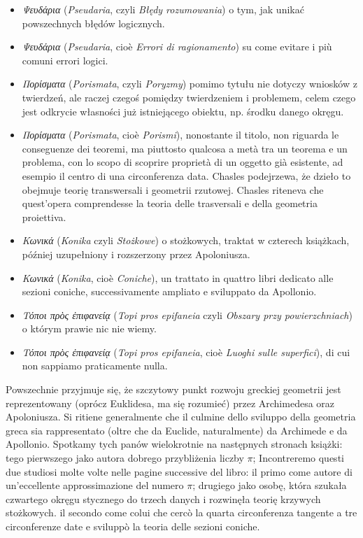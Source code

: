 \begin{itemize}
\item \emph{Ψευδάρια} (\emph{Pseudaria}, czyli \emph{Błędy rozumowania}) o tym, jak unikać powszechnych błędów logicznych. %
\item \emph{Ψευδάρια} (\emph{Pseudaria}, cioè \emph{Errori di ragionamento}) su come evitare i più comuni errori logici. %

\item \emph{Πορίσματα} (\emph{Porismata}, czyli \emph{Poryzmy}) pomimo tytułu nie dotyczy wniosków z twierdzeń, ale raczej czegoś pomiędzy twierdzeniem i problemem, celem czego jest odkrycie własności już istniejącego obiektu, np. środku danego okręgu. %
\item \emph{Πορίσματα} (\emph{Porismata}, cioè \emph{Porismi}), nonostante il titolo, non riguarda le conseguenze dei teoremi, ma piuttosto qualcosa a metà tra un teorema e un problema, con lo scopo di scoprire proprietà di un oggetto già esistente, ad esempio il centro di una circonferenza data. %
Chasles podejrzewa, że dzieło to obejmuje teorię transwersali i geometrii rzutowej. %
Chasles riteneva che quest'opera comprendesse la teoria delle trasversali e della geometria proiettiva. %
%

\item \emph{Κωνικά} (\emph{Konika} czyli \emph{Stożkowe}) o stożkowych, traktat w czterech książkach, później uzupełniony i rozszerzony przez Apoloniusza. %
\item \emph{Κωνικά} (\emph{Konika}, cioè \emph{Coniche}), un trattato in quattro libri dedicato alle sezioni coniche, successivamente ampliato e sviluppato da Apollonio. %

\item \emph{Τόποι πρὸς ἐπιφανείᾳ} (\emph{Topi pros epifaneia} czyli \emph{Obszary przy powierzchniach}) o którym prawie nic nie wiemy. %
\item \emph{Τόποι πρὸς ἐπιφανείᾳ} (\emph{Topi pros epifaneia}, cioè \emph{Luoghi sulle superfici}), di cui non sappiamo praticamente nulla. %
\end{itemize}

Powszechnie przyjmuje się, że szczytowy punkt rozwoju greckiej geometrii jest reprezentowany (oprócz Euklidesa, ma się rozumieć) przez Archimedesa oraz Apoloniusza. %
Si ritiene generalmente che il culmine dello sviluppo della geometria greca sia rappresentato (oltre che da Euclide, naturalmente) da Archimede e da Apollonio. %
Spotkamy tych panów wielokrotnie na następnych stronach książki: tego pierwszego jako autora dobrego przybliżenia liczby $\pi$; %
Incontreremo questi due studiosi molte volte nelle pagine successive del libro: il primo come autore di un'eccellente approssimazione del numero $\pi$; %
drugiego jako osobę, która szukała czwartego okręgu stycznego do trzech danych i rozwinęła teorię krzywych stożkowych. %
il secondo come colui che cercò la quarta circonferenza tangente a tre circonferenze date e sviluppò la teoria delle sezioni coniche. %

